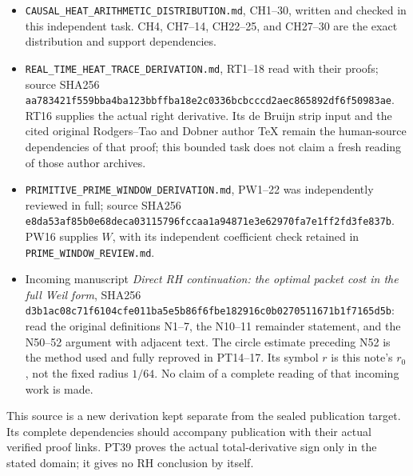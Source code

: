 \documentclass[
  10pt,
  a4paper,
]{article}
\providecommand{\tightlist}{%
  \setlength{\itemsep}{0pt}\setlength{\parskip}{0pt}}
\begin{document}
\begin{itemize}
\tightlist
\item
  \texttt{CAUSAL\_\allowbreak{}HEAT\_\allowbreak{}ARITHMETIC\_\allowbreak{}DISTRIBUTION.\allowbreak{}md}, CH1--30, written
  and checked in this independent task. CH4, CH7--14, CH22--25, and
  CH27--30 are the exact distribution and support dependencies.
\item
  \texttt{REAL\_\allowbreak{}TIME\_\allowbreak{}HEAT\_\allowbreak{}TRACE\_\allowbreak{}DERIVATION.\allowbreak{}md}, RT1--18 read with
  their proofs; source SHA256
  \texttt{aa783421\allowbreak{}f559bba4\allowbreak{}ba123bbf\allowbreak{}fba18e2c\allowbreak{}0336bcbc\allowbreak{}ccd2aec8\allowbreak{}65892df6\allowbreak{}f50983ae}.
  RT16 supplies the actual right derivative. Its de Bruijn strip input
  and the cited original Rodgers--Tao and Dobner author TeX remain the
  human-source dependencies of that proof; this bounded task does not
  claim a fresh reading of those author archives.
\item
  \texttt{PRIMITIVE\_\allowbreak{}PRIME\_\allowbreak{}WINDOW\_\allowbreak{}DERIVATION.\allowbreak{}md}, PW1--22 was
  independently reviewed in full; source SHA256
  \texttt{e8da53af\allowbreak{}85b0e68d\allowbreak{}eca03115\allowbreak{}796fccaa\allowbreak{}1a94871e\allowbreak{}3e62970f\allowbreak{}a7e1ff2f\allowbreak{}d3fe837b}.
  PW16 supplies \(W\), with its independent coefficient check retained
  in \texttt{PRIME\_\allowbreak{}WINDOW\_\allowbreak{}REVIEW.\allowbreak{}md}.
\item
  Incoming manuscript \emph{Direct RH continuation: the optimal packet
  cost in the full Weil form}, SHA256
  \texttt{d3b1ac08\allowbreak{}c71f6104\allowbreak{}cfe011ba\allowbreak{}5e5b86f6\allowbreak{}fbe18291\allowbreak{}6c0b0270\allowbreak{}511671b1\allowbreak{}f7165d5b}:
  read the original definitions N1--7, the N10--11 remainder statement,
  and the N50--52 argument with adjacent text. The circle estimate
  preceding N52 is the method used and fully reproved in PT14--17. Its
  symbol \(r\) is this note's \(r_0\), not the fixed radius \(1/64\). No
  claim of a complete reading of that incoming work is made.
\end{itemize}

This source is a new derivation kept separate from the sealed
publication target. Its complete dependencies should accompany
publication with their actual verified proof links. PT39 proves the
actual total-derivative sign only in the stated domain; it gives no RH
conclusion by itself.
\end{document}

